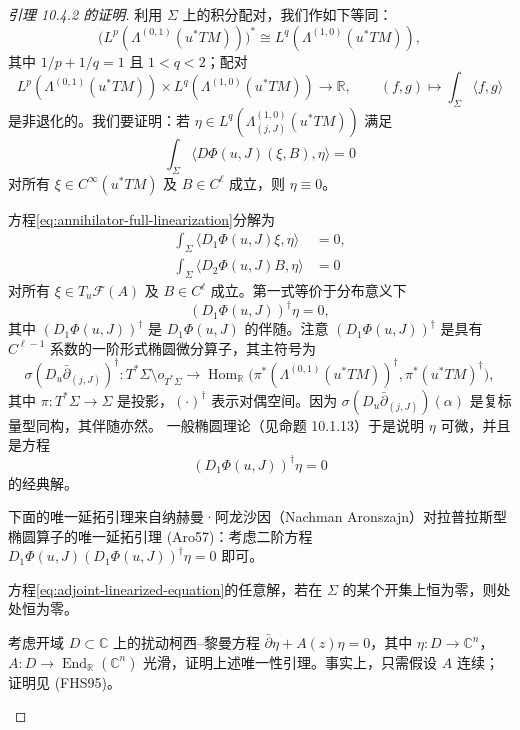 \begin{proof}[引理 10.4.2 的证明]
利用 $\Sigma$ 上的积分配对，我们作如下等同：
\[
 \bigl(L^p(\Lambda^{(0,1)}(u^*TM))\bigr)^*
 \cong L^q(\Lambda^{(1,0)}(u^*TM)),
\]
其中 $1/p+1/q=1$ 且 $1<q<2$；配对
\[
 L^p(\Lambda^{(0,1)}(u^*TM))\times
 L^q(\Lambda^{(1,0)}(u^*TM))\longrightarrow\mathbb R,
 \qquad (f,g)\longmapsto\int_\Sigma\langle f,g\rangle
\]
是非退化的。我们要证明：若
$\eta\in L^q(\Lambda_{(j,J)}^{(1,0)}(u^*TM))$ 满足
\begin{equation}
 \int_\Sigma\langle D\Phi(u,J)(\xi,B),\eta\rangle=0
 \label{eq:annihilator-full-linearization}
\end{equation}
对所有 $\xi\in C^\infty(u^*TM)$ 及 $B\in C^\ell$ 成立，则 $\eta\equiv0$。

方程\eqref{eq:annihilator-full-linearization}分解为
\begin{align}
 \int_\Sigma\langle D_1\Phi(u,J)\xi,\eta\rangle&=0,
 \label{eq:annihilator-map-direction}\\
 \int_\Sigma\langle D_2\Phi(u,J)B,\eta\rangle&=0
 \label{eq:annihilator-structure-direction}
\end{align}
对所有 $\xi\in T_u\mathcal F(A)$ 及 $B\in C^\ell$ 成立。第一式等价于分布意义下
\[
 (D_1\Phi(u,J))^\dagger\eta=0,
\]
其中 $(D_1\Phi(u,J))^\dagger$ 是 $D_1\Phi(u,J)$ 的伴随。注意
$(D_1\Phi(u,J))^\dagger$ 是具有 $C^{\ell-1}$ 系数的一阶形式椭圆微分算子，其主符号为
\[
 \sigma(D_u\bar\partial_{(j,J)})^\dagger:
 T^*\Sigma\setminus o_{T^*\Sigma}\longrightarrow
 \operatorname{Hom}_{\mathbb R}
 \bigl(\pi^*(\Lambda^{(0,1)}(u^*TM))^\dagger,
 \pi^*(u^*TM)^\dagger\bigr),
\]
其中 $\pi:T^*\Sigma\to\Sigma$ 是投影，$(\cdot)^\dagger$ 表示对偶空间。因为
$\sigma(D_u\bar\partial_{(j,J)})(\alpha)$ 是复标量型同构，其伴随亦然。
一般椭圆理论（见命题 10.1.13）于是说明 $\eta$ 可微，并且是方程
\begin{equation}
 (D_1\Phi(u,J))^\dagger\eta=0
 \label{eq:adjoint-linearized-equation}
\end{equation}
的经典解。

下面的唯一延拓引理来自纳赫曼·阿龙沙因（Nachman Aronszajn）对拉普拉斯型椭圆算子的唯一延拓引理 (Aro57)：考虑二阶方程
$D_1\Phi(u,J)(D_1\Phi(u,J))^\dagger\eta=0$ 即可。

\begin{lemma}[唯一延拓引理]\label{lem:unique-continuation-adjoint}
方程\eqref{eq:adjoint-linearized-equation}的任意解，若在 $\Sigma$ 的某个开集上恒为零，则处处恒为零。
\end{lemma}

\begin{exercise}\label{ex:unique-continuation-perturbed-cr}
考虑开域 $D\subset\mathbb C$ 上的扰动柯西--黎曼方程
$\bar\partial\eta+A(z)\eta=0$，其中
$\eta:D\to\mathbb C^n$，$A:D\to\operatorname{End}_{\mathbb R}(\mathbb C^n)$ 光滑，证明上述唯一性引理。事实上，只需假设 $A$ 连续；证明见 (FHS95)。
\end{exercise}


\end{proof}
